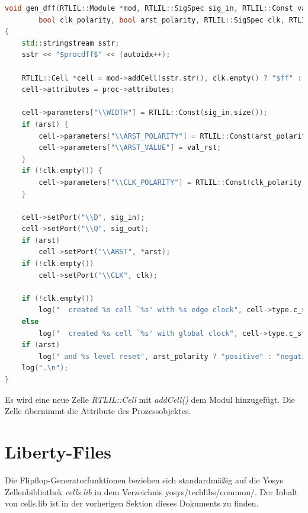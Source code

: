 \documentclass[11pt]{report}
\begin{document}
\begin{enumerate}
\begin{lstlisting}[language=C++]
void gen_dff(RTLIL::Module *mod, RTLIL::SigSpec sig_in, RTLIL::Const val_rst, RTLIL::SigSpec sig_out,
		bool clk_polarity, bool arst_polarity, RTLIL::SigSpec clk, RTLIL::SigSpec *arst, RTLIL::Process *proc)
{
	std::stringstream sstr;
	sstr << "$procdff$" << (autoidx++);

	RTLIL::Cell *cell = mod->addCell(sstr.str(), clk.empty() ? "$ff" : arst ? "$adff" : "$dff");
	cell->attributes = proc->attributes;

	cell->parameters["\\WIDTH"] = RTLIL::Const(sig_in.size());
	if (arst) {
		cell->parameters["\\ARST_POLARITY"] = RTLIL::Const(arst_polarity, 1);
		cell->parameters["\\ARST_VALUE"] = val_rst;
	}
	if (!clk.empty()) {
		cell->parameters["\\CLK_POLARITY"] = RTLIL::Const(clk_polarity, 1);
	}

	cell->setPort("\\D", sig_in);
	cell->setPort("\\Q", sig_out);
	if (arst)
		cell->setPort("\\ARST", *arst);
	if (!clk.empty())
		cell->setPort("\\CLK", clk);

	if (!clk.empty())
		log("  created %s cell `%s' with %s edge clock", cell->type.c_str(), cell->name.c_str(), clk_polarity ? "positive" : "negative");
	else
		log("  created %s cell `%s' with global clock", cell->type.c_str(), cell->name.c_str());
	if (arst)
		log(" and %s level reset", arst_polarity ? "positive" : "negative");
	log(".\n");
}
\end{lstlisting}
Es wird eine neue Zelle \textit{RTLIL::Cell} mit \textit{addCell()} dem Modul hinzugefügt. Die Zelle übernimmt die Attribute des Prozessobjektes. 


\end{enumerate}
\section{Liberty-Files}
Die Flipflop-Generatorfunktionen beziehen sich standardmäßig auf die Yosys Zellenbibliothek \textit{cells.lib} in dem Verzeichnis yosys/techlibs/common/. Der Inhalt von cells.lib ist in der vorherigen Sektion dieses Dokuments zu finden.
\printbibliography
\end{document}
